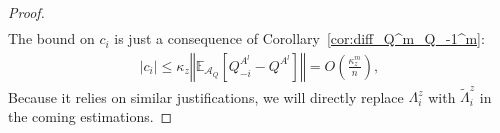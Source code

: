 \documentclass[a4papaer, titlepage]{book}
\begin{document}
\begin{proof}
\begin{align*}
  \end{align*} 
  The bound on $c_i$ is just a consequence of Corollary~\ref{cor:diff_Q^m_Q_-1^m}:
  \begin{align*}
    \left\vert c_i\right\vert
    \leq \kappa_z \left\Vert \mathbb E_{\mathcal A_Q}\left[  Q_{-i}^{A^l} -  Q^{A^l} \right]\right\Vert = O \left(\frac{\kappa_z^m}{n}\right),
  \end{align*}
  Because it relies on similar justifications, we will directly replace $\Lambda_i^z$ with $\tilde \Lambda_i^z$ in the coming estimations.


\end{proof}
\end{document}
